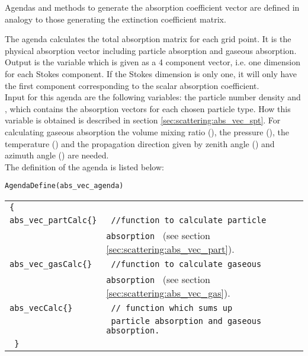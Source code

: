 \label{sec:scattering:abs_vec}

Agendas and methods to generate the absorption coefficient vector are
defined in analogy to those generating the extinction coefficient matrix.

\label{sec:scattering:abs_vec_agenda}

The agenda  calculates the total absorption
matrix \AbsVec{}
for each grid point. It is the physical absorption vector including
particle absorption and gaseous absorption.\\
Output is the variable  which is given
as a 4 component vector, i.e. one dimension for each Stokes component. If the
Stokes dimension is only one, it will only have the first component
corresponding to the scalar absorption coefficient. \\
Input for this agenda are the following variables:
the particle number density  and 
, which contains the absorption vectors  for
each chosen particle type. How this variable is obtained
is described in section \ref{sec:scattering:abs_vec_spt}. For calculating 
gaseous absorption the volume mixing ratio (), the
pressure  (), the temperature  () and the
propagation direction given by zenith angle () and
azimuth angle () are needed.\\
The definition of the agenda is listed below:

\verb|AgendaDefine(abs_vec_agenda)|\\
\begin{tabular}[h]{l l}
\verb|{ |\\
\verb|abs_vec_partCalc{}| & \verb| //function to calculate particle |\\
& \verb|absorption | (see section \ref{sec:scattering:abs_vec_part}).\\
\verb|abs_vec_gasCalc{}| & \verb| //function to calculate gaseous | \\
& \verb|absorption | (see section \ref{sec:scattering:abs_vec_gas}).\\ 
\verb|abs_vecCalc{}| &\verb| // function which sums up | \\
& \verb| particle absorption and gaseous absorption.|\\
\verb| }|
\end{tabular}




